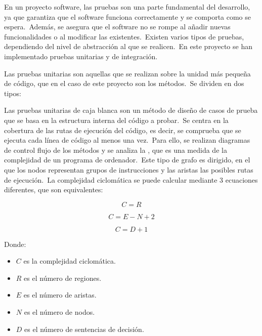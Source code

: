En un proyecto software, las pruebas son una parte fundamental del desarrollo, ya que garantiza que el software funciona
correctamente y se comporta como se espera.\ Además, se asegura que el software no se rompe al añadir nuevas
funcionalidades o al modificar las existentes.\ Existen varios tipos de pruebas, dependiendo del nivel de abstracción
al que se realicen.\ En este proyecto se han implementado pruebas unitarias y de integración.


Las pruebas unitarias son aquellas que se realizan sobre la unidad más pequeña de código, que en el caso de este
proyecto son los métodos.\ Se dividen en dos tipos:


Las pruebas unitarias de caja blanca son un método de diseño de casos de prueba que se basa en la estructura interna
del código a probar.\ Se centra en la cobertura de las rutas de ejecución del código, es decir, se comprueba que se
ejecuta cada línea de código al menos una vez.\ Para ello, se realizan diagramas de control flujo de los métodos y se
analiza la , que es una medida de la complejidad de un programa de
ordenador.\ Este tipo de grafo es dirigido, en el que los
nodos representan grupos de instrucciones y las aristas las posibles rutas de ejecución.\ La complejidad ciclomática
se puede calcular mediante 3 ecuaciones diferentes, que son equivalentes:

\begin{center}
	\begin{equation}
		C = R
		\label{eq:complejidad-ciclomatica-1}
	\end{equation}

	\begin{equation}
		C = E - N + 2
		\label{eq:complejidad-ciclomatica-2}
	\end{equation}

	\begin{equation}
		C = D + 1
		\label{eq:complejidad-ciclomatica-3}
	\end{equation}
\end{center}

Donde:
\begin{itemize}
	\item $C$ es la complejidad ciclomática.
	\item $R$ es el número de regiones.
	\item $E$ es el número de aristas.
	\item $N$ es el número de nodos.
	\item $D$ es el número de sentencias de decisión.
\end{itemize}

